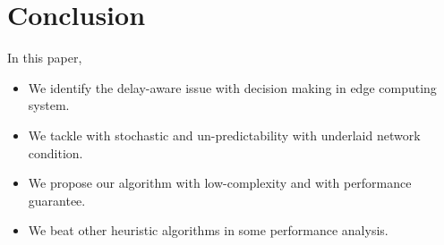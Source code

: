 \section{Conclusion}
\label{sec:conclusion}
In this paper, 

\begin{itemize}
    \item We identify the delay-aware issue with decision making in edge computing system.
    \item We tackle with stochastic and un-predictability with underlaid network condition.
    \item We propose our algorithm with low-complexity and with performance guarantee.
    \item We beat other heuristic algorithms in some performance analysis.
\end{itemize}